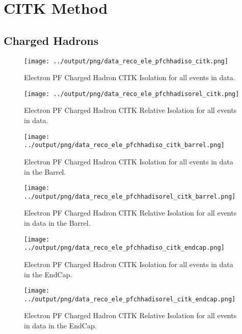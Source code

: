 \documentclass[11pt]{book}
\begin{document}
\section{CITK Method}
\subsection{Charged Hadrons}
\begin{figure}[htb]
\centering
\texttt{[image: ../output/png/data\_reco\_ele\_pfchhadiso\_citk.png]}
\caption{Electron PF Charged Hadron CITK Isolation for all events in data.}
\label{fig:data_ele_pfchhadiso_citk}
\end{figure}

\begin{figure}[htb]
\centering
\texttt{[image: ../output/png/data\_reco\_ele\_pfchhadisorel\_citk.png]}
\caption{Electron PF Charged Hadron CITK Relative Isolation for all events in data.}
\label{fig:data_ele_pfchhadisorel_citk}
\end{figure}

\begin{figure}[htb]
\centering
\texttt{[image: ../output/png/data\_reco\_ele\_pfchhadiso\_citk\_barrel.png]}
\caption{Electron PF Charged Hadron CITK Isolation for all events in data in the Barrel.}
\label{fig:data_ele_pfchhadiso_citk_barrel}
\end{figure}

\begin{figure}[htb]
\centering
\texttt{[image: ../output/png/data\_reco\_ele\_pfchhadisorel\_citk\_barrel.png]}
\caption{Electron PF Charged Hadron CITK Relative Isolation for all events in data in the Barrel.}
\label{fig:data_ele_pfchhadisorel_citk_barrel}
\end{figure}

\begin{figure}[htb]
\centering
\texttt{[image: ../output/png/data\_reco\_ele\_pfchhadiso\_citk\_endcap.png]}
\caption{Electron PF Charged Hadron CITK Isolation for all events in data in the EndCap.}
\label{fig:data_ele_pfchhadiso_citk_endcap}
\end{figure}

\begin{figure}[htb]
\centering
\texttt{[image: ../output/png/data\_reco\_ele\_pfchhadisorel\_citk\_endcap.png]}
\caption{Electron PF Charged Hadron CITK Relative Isolation for all events in data in the EndCap.}
\label{fig:data_ele_pfchhadisorel_citk_endcap}
\end{figure}
\clearpage
\end{document}
